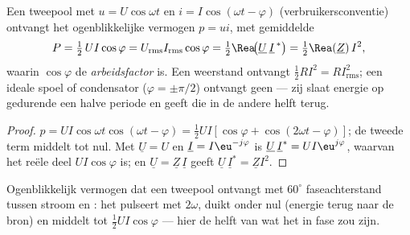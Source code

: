 \begin{theorem}\label{thm:b1:sinusoidal-impedance:power}
Een tweepool met $u = U\cos\omega t$ en $i = I\cos(\omega t - \varphi)$
(verbruikersconventie) ontvangt het ogenblikkelijke vermogen $p = ui$, met
gemiddelde
\[
P = \tfrac12\,UI\cos\varphi = U_{\mathrm{rms}}I_{\mathrm{rms}}\cos\varphi
= \tfrac12\Rea\!\big(\underline U\,\underline I^{\,*}\big) = \tfrac12\Rea(\underline Z)\,I^2,
\]
waarin $\cos\varphi$ de \emph{arbeidsfactor} is. Een weerstand ontvangt
$\tfrac12 RI^2 = RI_{\mathrm{rms}}^2$; een ideale spoel of condensator
($\varphi = \pm\pi/2$) ontvangt geen  --- zij slaat energie op
gedurende een halve periode en geeft die in de andere helft terug.
\end{theorem}

\begin{proof}
$p = UI\cos\omega t\cos(\omega t - \varphi) = \tfrac12 UI[\cos\varphi +
\cos(2\omega t - \varphi)]$; de tweede term middelt tot nul. Met
$\underline U = U$ en $\underline I = I\eu^{-j\varphi}$ is
$\underline U\,\underline I^* = UI\eu^{j\varphi}$, waarvan het reële deel
$UI\cos\varphi$ is; en $\underline U = \underline Z\,\underline I$ geeft
$\underline U\,\underline I^* = \underline Z I^2$.
\end{proof}

\begin{omfigure}

{\small Ogenblikkelijk vermogen dat een tweepool ontvangt met $60^\circ$
faseachterstand tussen stroom en : het pulseert met $2\omega$, duikt onder nul
(energie terug naar de bron) en middelt tot $\tfrac12 UI\cos\varphi$
--- hier de helft van wat het in fase zou zijn.}
\end{omfigure}

